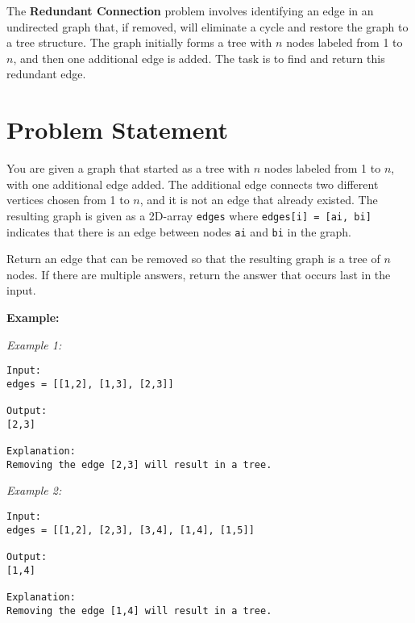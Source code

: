 
\label{problem:redundant_connection}
    
The \textbf{Redundant Connection} problem involves identifying an edge in an undirected graph that, if removed, will eliminate a cycle and restore the graph to a tree structure. The graph initially forms a tree with \(n\) nodes labeled from 1 to \(n\), and then one additional edge is added. The task is to find and return this redundant edge.

\section*{Problem Statement}

You are given a graph that started as a tree with \(n\) nodes labeled from 1 to \(n\), with one additional edge added. The additional edge connects two different vertices chosen from 1 to \(n\), and it is not an edge that already existed. The resulting graph is given as a 2D-array \texttt{edges} where \texttt{edges[i] = [ai, bi]} indicates that there is an edge between nodes \texttt{ai} and \texttt{bi} in the graph.

Return an edge that can be removed so that the resulting graph is a tree of \(n\) nodes. If there are multiple answers, return the answer that occurs last in the input.

\textbf{Example:}

\textit{Example 1:}

\begin{verbatim}
Input:
edges = [[1,2], [1,3], [2,3]]

Output:
[2,3]

Explanation:
Removing the edge [2,3] will result in a tree.
\end{verbatim}

\textit{Example 2:}

\begin{verbatim}
Input:
edges = [[1,2], [2,3], [3,4], [1,4], [1,5]]

Output:
[1,4]

Explanation:
Removing the edge [1,4] will result in a tree.
\end{verbatim}


